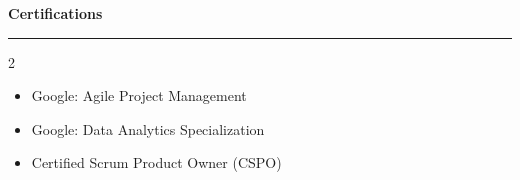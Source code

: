 \documentclass[9pt,letterpaper]{article} %
\newenvironment{rSection}[1]{ %
  \sectionskip
 \textbf{\Large #1} %
  \sectionlineskip
  \hrule %
  \begin{list}{}{ %
    \setlength{\leftmargin}{-0em} %
  }
  \item[]
}{
  \end{list}
}
\def\sectionlineskip{\smallskip} %
\def\sectionskip{} %
\begin{document}
\begin{rSection}{Certifications}
\begin{multicols}{2}
\begin{itemize}[left=-1.5em, labelsep=.1cm, labelwidth=.2cm, itemsep=0.0em, topsep=0pt]
\item Google: Agile Project Management
\item Google: Data Analytics Specialization
\item Certified Scrum Product Owner (CSPO)
\end{itemize}
\end{multicols}
\end{rSection}
\end{document}
